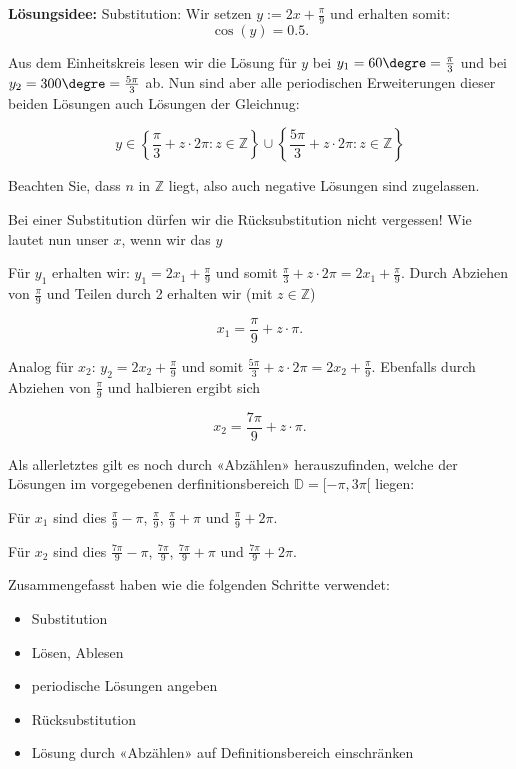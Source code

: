 \textbf{Lösungsidee:} Substitution:
Wir setzen $y := 2x + \frac{\pi}{9}$ und erhalten somit:
$$\cos(y) = 0.5.$$

Aus dem Einheitskreis lesen wir die Lösung für $y$ bei $y_1=60\degre = \frac{\pi}{3}$ und bei $y_2=300\degre = \frac{5\pi}{3}$ ab. Nun sind aber alle periodischen Erweiterungen dieser beiden Lösungen auch Lösungen der Gleichnug:

$$y \in \left\{\frac{\pi}{3} + z\cdot{}2\pi: z\in\mathbb{Z}\right\} \cup \left\{\frac{5\pi}{3}+ z\cdot{}2\pi: z\in\mathbb{Z}\right\}$$

Beachten Sie, dass $n$ in $\mathbb{Z}$ liegt, also auch negative Lösungen sind zugelassen.

Bei einer Substitution dürfen wir die Rücksubstitution nicht vergessen! Wie lautet nun unser $x$, wenn wir das $y$ 

Für $y_1$ erhalten wir: $y_1= 2x_1 + \frac{\pi}{9}$ und somit $\frac{\pi}{3} + z\cdot{}2\pi = 2x_1 + \frac{\pi}{9}$. Durch Abziehen von $\frac{\pi}{9}$ und Teilen durch 2 erhalten wir (mit $z\in\mathbb{Z}$)

$$x_1 = \frac{\pi}{9} + z\cdot{}\pi.$$

Analog für $x_2$: $y_2 = 2x_2 + \frac{\pi}{9}$ und somit $\frac{5\pi}{3} + z\cdot{}2\pi = 2x_2 + \frac{\pi}{9}$. Ebenfalls durch Abziehen von $\frac{\pi}{9}$ und halbieren ergibt sich

$$x_2 = \frac{7\pi}{9} + z\cdot{}\pi.$$

Als allerletztes gilt es noch durch «Abzählen» herauszufinden, welche der Lösungen im vorgegebenen derfinitionsbereich $\mathbb{D} = [-\pi, 3\pi[$ liegen:

    Für $x_1$ sind dies $\frac{\pi}{9} - \pi$, $\frac{\pi}{9}$, $\frac{\pi}{9} + \pi$ und $\frac{\pi}{9} + 2\pi$.

    Für $x_2$ sind dies $\frac{7\pi}{9} - \pi$, $\frac{7\pi}{9}$, $\frac{7\pi}{9} + \pi$ und $\frac{7\pi}{9} + 2\pi$.
   
    Zusammengefasst haben wie die folgenden Schritte verwendet:
    \begin{rezept}{}{}
\begin{itemize}
    \item Substitution
    \item Lösen, Ablesen
    \item periodische Lösungen angeben
    \item Rücksubstitution
    \item Lösung durch «Abzählen» auf Definitionsbereich einschränken
\end{itemize}
\end{rezept}
\newpage

